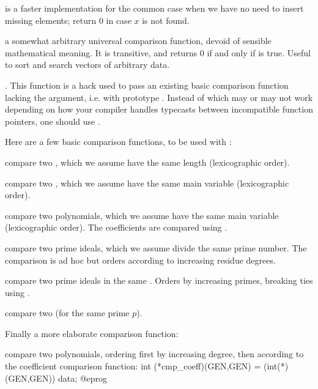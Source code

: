  is a faster
implementation for the common case 
when we have no need to insert missing elements; return $0$ in case $x$
is not found.


 a somewhat arbitrary universal
comparison function, devoid of sensible mathematical meaning. It is
transitive, and returns 0 if and only if  is true.
Useful to sort and search vectors of arbitrary data.

. This function is a hack
used to pass an existing basic comparison function lacking the 
argument, i.e. with prototype . Instead of
 which may or may not work depending on how your
compiler handles typecasts between incompatible function pointers, one should
use .

Here are a few basic comparison functions, to be used with :

 compare two , which we assume have
the same length (lexicographic order).

 compare two , which we assume
have the same main variable (lexicographic order).

 compare two polynomials, which we assume
have the same main variable (lexicographic order). The coefficients are
compared using .

 compare two prime ideals, which
we assume divide the same prime number. The comparison is ad hoc but orders
according to increasing residue degrees.

 compare two prime ideals in the same
. Orders by increasing primes, breaking ties using
.

 compare two  (for the same
prime $p$).

Finally a more elaborate comparison function:

 compare two polynomials,
ordering first by increasing degree, then according to the coefficient
comparison function:
\bprog
  int (*cmp_coeff)(GEN,GEN) = (int(*)(GEN,GEN)) data;
@eprog

